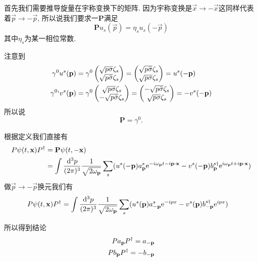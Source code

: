 \begin{example}[Dirac旋量的宇称变换]
    首先我们需要推导旋量在宇称变换下的矩阵. 因为宇称变换是$\vec x\to-\vec x$这同样代表着$\vec p\to-\vec p$, 所以说我们要求一$\boldsymbol{\mathbf P}$满足
    \begin{equation}
        \boldsymbol{\mathbf P}u_s(\vec p)=\eta_s u_s(-\vec p)
    \end{equation}
    其中$\eta_s$为某一相位常数.

    注意到
    \begin{align}
        \gamma^0u^s(\vec p)&=\gamma^0\begin{pmatrix}
            \sqrt{p\sigma}\zeta_s\\
            \sqrt{p\bar\sigma}\zeta_s
        \end{pmatrix}=\begin{pmatrix}
            \sqrt{p\bar\sigma}\zeta_s\\
            \sqrt{p\sigma}\zeta_s
        \end{pmatrix}=u^s(-\vec p)\\
        \gamma^0`v^s(\vec p)&=\gamma^0\begin{pmatrix}
            \sqrt{p\sigma}\zeta_s\\
            -\sqrt{p\bar\sigma}\zeta_s
        \end{pmatrix}=\begin{pmatrix}
            -\sqrt{p\bar\sigma}\zeta_s\\
            \sqrt{p\sigma}\zeta_s
        \end{pmatrix}=-v^s(-\vec p)
    \end{align}
    所以说
    \begin{equation}
        \boldsymbol{\mathbf P}=\gamma^0.
    \end{equation}

    根据定义我们直接有
    \begin{align}
        P\psi(t,\vec x)P^\dagger&=\boldsymbol{\mathbf P}\psi(t,-\vec x)\\
        &=\int\ldsq{p}\sum_s(u^s(-\vec p)\a{p}^s\exp{-i\om pt-i\vec p\cdot\vec x}-v^{s}(-\vec p)\b{p}^{s\dagger}\exp{i\om pt+i\vec p\cdot\vec x})
    \end{align}
    做$\vec p\to-\vec p$换元我们有
    \begin{align}
        P\psi(t,\vec x)P^\dagger&=\int\ldsq{p}\sum_s(u^s(\vec p)\a{-p}^s\exp{-ipx}-v^{s}(\vec p)\b{-p}^{s\dagger}\exp{ipx})
    \end{align}

    所以得到结论
    \begin{align}
        P\a p P^\dagger=\a{-p}\\
        P\b p P^\dagger=-\b{-p}
    \end{align}
\end{example}

